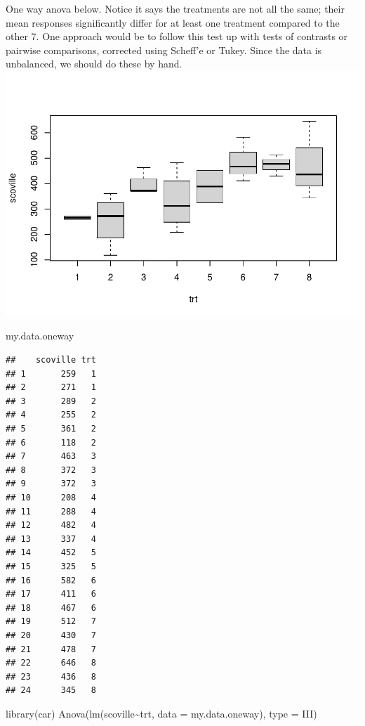 \documentclass[
]{book}
\newenvironment{Shaded}{\begin{snugshade}}{\end{snugshade}}
\newcommand{\AttributeTok}[1]{\textcolor[rgb]{0.77,0.63,0.00}{#1}}
\newcommand{\FunctionTok}[1]{\textcolor[rgb]{0.00,0.00,0.00}{#1}}
\newcommand{\NormalTok}[1]{#1}
\newcommand{\SpecialCharTok}[1]{\textcolor[rgb]{0.00,0.00,0.00}{#1}}
\newcommand{\StringTok}[1]{\textcolor[rgb]{0.31,0.60,0.02}{#1}}
\begin{document}
One way anova below. Notice it says the treatments are not all the same; their mean responses significantly differ for at least one treatment compared to the other 7. One approach would be to follow this test up with tests of contrasts or pairwise comparisons, corrected using Scheff'e or Tukey. Since the data is unbalanced, we should do these by hand.\\
\includegraphics{10-MissingCellsInTwoWay_files/figure-latex/unnamed-chunk-4-1.pdf}

\begin{Shaded}
\begin{Highlighting}[]
\NormalTok{my.data.oneway}
\end{Highlighting}
\end{Shaded}

\begin{verbatim}
##    scoville trt
## 1       259   1
## 2       271   1
## 3       289   2
## 4       255   2
## 5       361   2
## 6       118   2
## 7       463   3
## 8       372   3
## 9       372   3
## 10      208   4
## 11      288   4
## 12      482   4
## 13      337   4
## 14      452   5
## 15      325   5
## 16      582   6
## 17      411   6
## 18      467   6
## 19      512   7
## 20      430   7
## 21      478   7
## 22      646   8
## 23      436   8
## 24      345   8
\end{verbatim}

\begin{Shaded}
\begin{Highlighting}[]
\FunctionTok{library}\NormalTok{(car)}
\FunctionTok{Anova}\NormalTok{(}\FunctionTok{lm}\NormalTok{(scoville}\SpecialCharTok{\textasciitilde{}}\NormalTok{trt, }\AttributeTok{data =}\NormalTok{ my.data.oneway), }\AttributeTok{type =} \StringTok{\textquotesingle{}III\textquotesingle{}}\NormalTok{)}
\end{Highlighting}
\end{Shaded}
\end{document}
